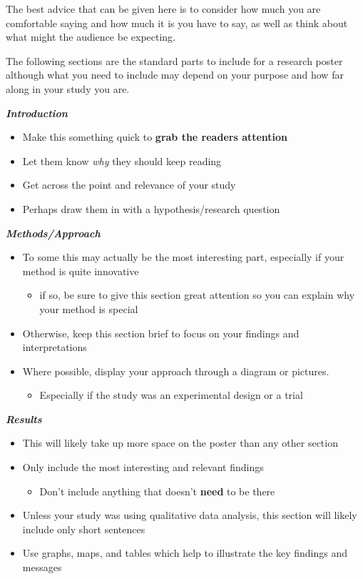 \documentclass[
  titlepage]{book}
\providecommand{\tightlist}{%
  \setlength{\itemsep}{0pt}\setlength{\parskip}{0pt}}
\begin{document}
The best advice that can be given here is to consider how much you are comfortable saying and how much it is you have to say, as well as think about what might the audience be expecting.

The following sections are the standard parts to include for a research poster although what you need to include may depend on your purpose and how far along in your study you are.

\textbf{\emph{Introduction}}

\begin{itemize}
\tightlist
\item
  Make this something quick to \textbf{grab the readers attention}
\item
  Let them know \emph{why} they should keep reading
\item
  Get across the point and relevance of your study
\item
  Perhaps draw them in with a hypothesis/research question
\end{itemize}

\textbf{\emph{Methods/Approach}}

\begin{itemize}
\tightlist
\item
  To some this may actually be the most interesting part, especially if your method is quite innovative

  \begin{itemize}
  \tightlist
  \item
    if so, be sure to give this section great attention so you can explain why your method is special
  \end{itemize}
\item
  Otherwise, keep this section brief to focus on your findings and interpretations
\item
  Where possible, display your approach through a diagram or pictures.

  \begin{itemize}
  \tightlist
  \item
    Especially if the study was an experimental design or a trial
  \end{itemize}
\end{itemize}

\textbf{\emph{Results}}

\begin{itemize}
\tightlist
\item
  This will likely take up more space on the poster than any other section
\item
  Only include the most interesting and relevant findings

  \begin{itemize}
  \tightlist
  \item
    Don't include anything that doesn't \textbf{need} to be there
  \end{itemize}
\item
  Unless your study was using qualitative data analysis, this section will likely include only short sentences
\item
  Use graphs, maps, and tables which help to illustrate the key findings and messages
\end{itemize}
\end{document}
